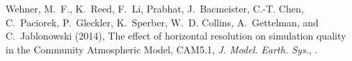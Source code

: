 \documentclass[ms]{agutexSI}
\begin{document}
\begin{article}
\begin{thebibliography}{1}
Wehner, M.~F., K.~Reed, F.~Li, Prabhat, J.~Bacmeister, C.-T. Chen, C.~Paciorek,
  P.~Gleckler, K.~Sperber, W.~D. Collins, A.~Gettelman, and C.~Jablonowski
  (2014), {The effect of horizontal resolution on simulation quality in the
  Community Atmospheric Model, CAM5.1}, \textit{J. Model. Earth. Sys.},
  .
  
\end{thebibliography}
%
%
%
%
%
%
%
%


%
%
%
%


\end{article}
\end{document}
